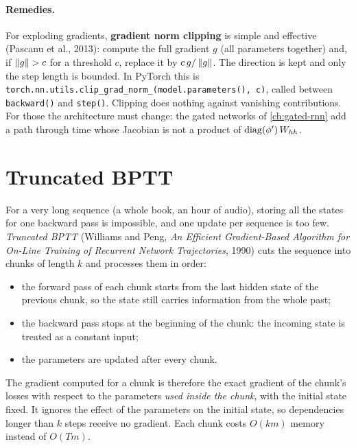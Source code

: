 \begin{notechapter}
\paragraph{Remedies.} For exploding gradients, \textbf{gradient norm clipping} is simple and
effective (Pascanu et al., 2013): compute the full gradient $g$ (all parameters together) and,
if $\left\|g\right\| > c$ for a threshold $c$, replace it by $c\,g/\left\|g\right\|$. The direction is kept and only the step
length is bounded. In PyTorch this is \texttt{torch.nn.utils.clip\_grad\_norm\_(model.parameters(), c)},
called between \texttt{backward()} and \texttt{step()}. Clipping does nothing against vanishing
contributions. For those the architecture must change: the gated networks of
\cref{ch:gated-rnn} add a path through time whose Jacobian is not a product of
$\operatorname{diag}(\phi')\,W_{hh}$.

\section{Truncated BPTT}\label{rnn-bptt:sec:truncated}

For a very long sequence (a whole book, an hour of audio), storing all the states for one
backward pass is impossible, and one update per sequence is too few. \emph{Truncated BPTT}
(Williams and Peng, \emph{An Efficient Gradient-Based Algorithm for On-Line Training
of Recurrent Network Trajectories}, 1990) cuts the sequence into chunks of length $k$ and processes them in order:
\begin{itemize}[nosep]
  \item the forward pass of each chunk starts from the last hidden state of the previous
        chunk, so the state still carries information from the whole past;
  \item the backward pass stops at the beginning of the chunk: the incoming state is
        treated as a constant input;
  \item the parameters are updated after every chunk.
\end{itemize}
The gradient computed for a chunk is therefore the exact gradient of the chunk's losses
with respect to the parameters \emph{used inside the chunk}, with the initial state fixed. It
ignores the effect of the parameters on the initial state, so dependencies longer than $k$
steps receive no gradient. Each chunk costs $O(km)$ memory instead of $O(Tm)$.


\end{notechapter}
